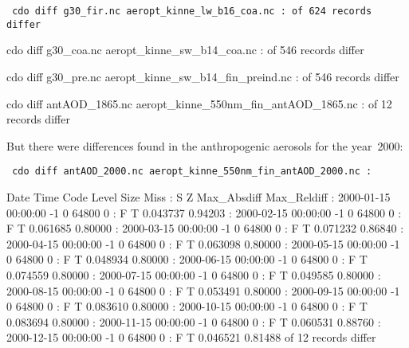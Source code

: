 \begin{appendix}
{\tt
cdo diff g30\_fir.nc aeropt\_kinne\_lw\_b16\_coa.nc : of 624 records differ\newline

cdo diff g30\_coa.nc aeropt\_kinne\_sw\_b14\_coa.nc : of 546 records differ\newline

cdo diff g30\_pre.nc aeropt\_kinne\_sw\_b14\_fin\_preind.nc : of 546 records differ\newline

cdo diff antAOD\_1865.nc aeropt\_kinne\_550nm\_fin\_antAOD\_1865.nc : of 12 records differ\newline
}

But there were differences found in the anthropogenic aerosols for the
year~2000:

{\tt
cdo diff antAOD\_2000.nc aeropt\_kinne\_550nm\_fin\_antAOD\_2000.nc :\newline

               Date  Time    Code  Level    Size    Miss : S Z
               Max\_Absdiff Max\_Reldiff : 2000-01-15 00:00:00  -1       0   64800       0 : F T     0.043737     0.94203 : 2000-02-15 00:00:00  -1       0   64800       0 : F T     0.061685     0.80000 : 2000-03-15 00:00:00  -1       0   64800       0 : F T     0.071232     0.86840 : 2000-04-15 00:00:00  -1       0   64800       0 : F T     0.063098     0.80000 : 2000-05-15 00:00:00  -1       0   64800       0 : F T     0.048934     0.80000 : 2000-06-15 00:00:00  -1       0   64800       0 : F T     0.074559     0.80000 : 2000-07-15 00:00:00  -1       0   64800       0 : F T     0.049585     0.80000 : 2000-08-15 00:00:00  -1       0   64800       0 : F T     0.053491     0.80000 : 2000-09-15 00:00:00  -1       0   64800       0 : F T     0.083610     0.80000 : 2000-10-15 00:00:00  -1       0   64800       0 : F T     0.083694     0.80000 : 2000-11-15 00:00:00  -1       0   64800       0 : F T     0.060531     0.88760 : 2000-12-15 00:00:00  -1       0   64800       0 : F T     0.046521     0.81488 of 12 records differ\newline
}


\end{appendix}
